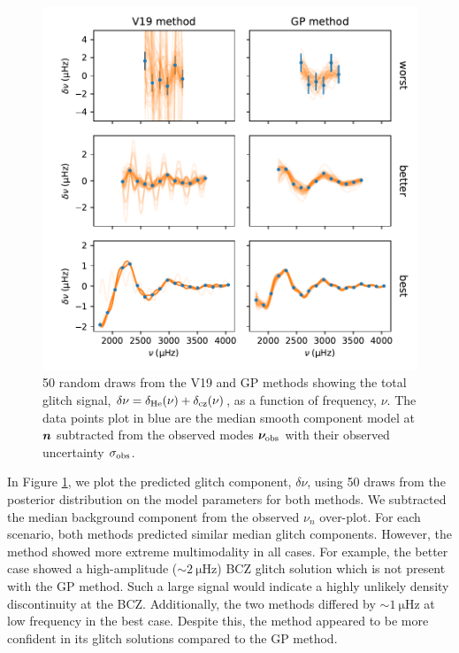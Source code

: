 \begin{figure}[!tbp]
    \centering
    \includegraphics{figures/glitch-test-signal.pdf}
    \caption{50 random draws from the V19 and GP methods showing the total glitch signal, \(\delta\nu = \delta_{{\mathrm{He}}}(\nu) + \delta_{{\mathrm{cz}}}(\nu)\), as a function of frequency, \(\nu\). The data points plot in blue are the median smooth component model at \(\bm{n}\) subtracted from the observed modes \(\bm{\nu}_{{\mathrm{obs}}}\) with their observed uncertainty \(\sigma_{{\mathrm{obs}}}\).}
    \label{fig:glitch-test-signal}
\end{figure}

In Figure \ref{fig:glitch-test-signal}, we plot the predicted glitch component, \(\delta\nu\), using 50 draws from the posterior distribution on the model parameters for both methods. We subtracted the median background component from the observed \(\nu_n\) over-plot. For each scenario, both methods predicted similar median glitch components. However, the  method showed more extreme multimodality in all cases. For example, the better case showed a high-amplitude (\(\sim \SI{2}{\micro\hertz}\)) BCZ glitch solution which is not present with the GP method. Such a large signal would indicate a highly unlikely density discontinuity at the BCZ. Additionally, the two methods differed by \(\sim \SI{1}{\micro\hertz}\) at low frequency in the best case. Despite this, the  method appeared to be more confident in its glitch solutions compared to the GP method.


